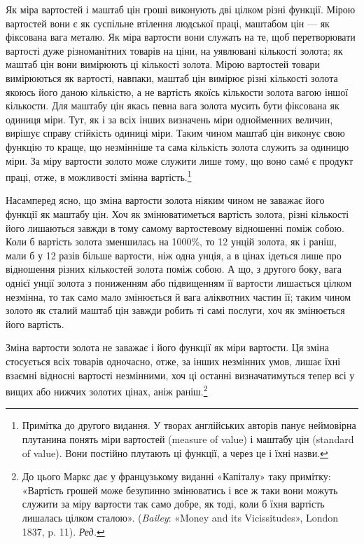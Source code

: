 Як міра вартостей і маштаб цін гроші виконують дві цілком
різні функції. Мірою вартостей вони є як суспільне втілення
людської праці, маштабом цін — як фіксована вага металю.
Як міра вартости вони служать на те, щоб перетворювати вартості
дуже різноманітних товарів на ціни, на уявлювані кількості
золота; як маштаб цін вони вимірюють ці кількості золота. Мірою
вартостей товари вимірюються як вартості, навпаки, маштаб
цін вимірює різні кількості золота якоюсь його даною кількістю,
а не вартість якоїсь кількости золота вагою іншої кількости.
Для маштабу цін якась певна вага золота мусить бути фіксована
як одиниця міри. Тут, як і за всіх інших визначень міри однойменних
величин, вирішує справу стійкість одиниці міри. Таким
чином маштаб цін виконує свою функцію то краще, що незмінніше
та сама кількість золота служить за одиницю міри. За міру
вартости золото може служити лише тому, що воно самé є продукт
праці, отже, в можливості змінна вартість.\footnote{
Примітка до другого видання. У творах англійських авторів
панує неймовірна плутанина понять міри вартостей (measure of value)
і маштабу цін (standard of value). Вони постійно плутають ці функції,
а через це і їхні назви.
}

Насамперед ясно, що зміна вартости золота ніяким чином не
заважає його функції як маштабу цін. Хоч як змінюватиметься
вартість золота, різні кількості його лишаються завжди в тому
самому вартостевому відношенні поміж собою. Коли б вартість
золота зменшилась на 1000\%, то 12 унцій золота, як і раніш, мали б
у 12 разів більше вартости, ніж одна унція, а в цінах ідеться
лише про відношення різних кількостей золота поміж собою.
А що, з другого боку, вага однієї унції золота з пониженням
або підвищенням її вартости лишається цілком незмінна, то так
само мало змінюється й вага аліквотних частин її; таким чином
золото як сталий маштаб цін завжди робить ті самі послуги, хоч
як змінюється його вартість.

Зміна вартости золота не заважає і його функції як міри вартости.
Ця зміна стосується всіх товарів одночасно, отже, за інших
незмінних умов, лишає їхні взаємні відносні вартості незмінними,
хоч ці останні визначатимуться тепер всі у вищих або
нижчих золотих цінах, аніж раніш.\footnote*{
До цього Маркс дає у французькому виданні «Капіталу» таку примітку:
«Вартість грошей може безупинно змінюватись і все ж таки вони
можуть служити за міру вартости так само добре, як тоді, коли б їхня
вартість лишалась цілком сталою». (\emph{Bailey}: «Money and its Vicissitudes»,
London 1837, p. 11). \emph{Ред.}
}

